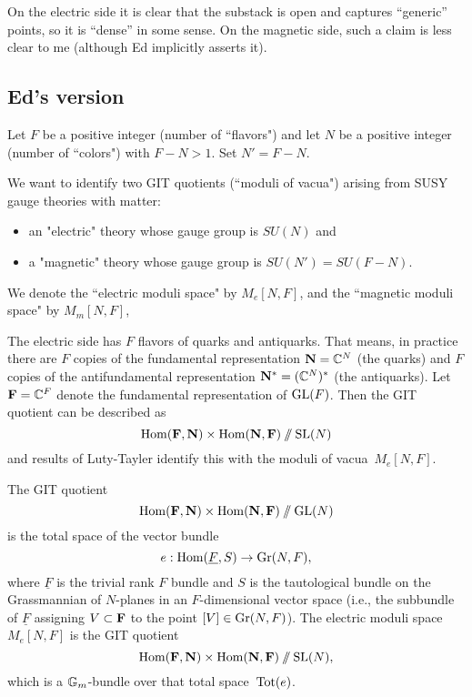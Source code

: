 \documentclass[11pt]{amsart}
\begin{document}
On the electric side it is clear that the substack is open and captures ``generic'' points,
so it is ``dense'' in some sense.
On the magnetic side, such a claim is less clear to me (although Ed implicitly asserts it).


\subsection{Ed's version}

Let $F$ be a positive integer (number of ``flavors") and let $N$ be a positive integer (number of ``colors") with $F - N > 1$. 
Set $N' = F-N$.

We want to identify two GIT quotients (``moduli of vacua") arising from SUSY gauge theories with matter:
\begin{itemize}
\item an "electric" theory  whose gauge group is $SU(N)$ and
\item a "magnetic" theory whose gauge group is $SU(N') = SU(F-N)$.
\end{itemize}
We denote the ``electric moduli space" by $M_e[N,F]$, 
and the ``magnetic moduli space" by $M_m[N,F]$,

The electric side has $F$ flavors of quarks and antiquarks. 
That means, in practice there are $F$ copies of the fundamental representation $\mathbf N = \mathbb C^N$
(the quarks) 
and $F$ copies of the antifundamental representation $\mathbf N^* = (\mathbb C^N)^*$ (the antiquarks). 
Let $\mathbf F = \mathbb C^F$ denote the fundamental representation of $\operatorname{GL}(F)$.
Then the GIT quotient can be described as
\[
{\rm Hom}(\mathbf F, \mathbf N) \times {\rm Hom}(\mathbf N,\mathbf F)\mathbin{/\mkern-6mu/} \operatorname{SL}(N)
\]
and results of Luty-Tayler identify this with the moduli of vacua~$M_e[N,F]$.

\begin{prop}
The GIT quotient 
\[
{\rm Hom}(\mathbf F, \mathbf N) \times {\rm Hom}(\mathbf N,\mathbf F)\mathbin{/\mkern-6mu/} \operatorname{GL}(N)
\]
is the total space of the vector bundle
\[
e: {\rm Hom}(\underline{F}, S) \to {\rm Gr}(N,F),
\]
where $\underline{F}$ is the trivial rank $F$ bundle and $S$ is the tautological bundle on the Grassmannian of $N$-planes in an $F$-dimensional vector space
(i.e., the subbundle of $\underline{F}$ assigning $V \subset \mathbf F$ to the point $[V] \in {\rm Gr}(N,F)$).
The electric moduli space $M_e[N,F]$ is the GIT quotient 
\[
{\rm Hom}(\mathbf F, \mathbf N) \times {\rm Hom}(\mathbf N,\mathbf F)\mathbin{/\mkern-6mu/} \operatorname{SL}(N),
\]
which is a $\mathbb G_m$-bundle over that total space~$\operatorname{Tot}(e)$.
\end{prop}
\end{document}
